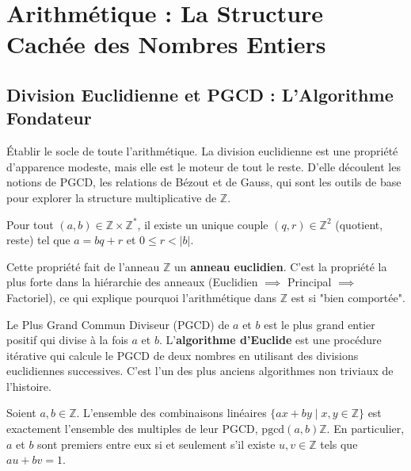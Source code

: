 \chapter{Arithmétique : La Structure Cachée des Nombres Entiers}

\section{Division Euclidienne et PGCD : L'Algorithme Fondateur}

\begin{objectif}
    Établir le socle de toute l'arithmétique. La division euclidienne est une propriété d'apparence modeste, mais elle est le moteur de tout le reste. D'elle découlent les notions de PGCD, les relations de Bézout et de Gauss, qui sont les outils de base pour explorer la structure multiplicative de $\mathbb{Z}$.
\end{objectif}

\begin{theorem}
    Pour tout $(a,b) \in \mathbb{Z} \times \mathbb{Z}^*$, il existe un unique couple $(q,r) \in \mathbb{Z}^2$ (quotient, reste) tel que $a = bq + r$ et $0 \leq r < |b|$.
\end{theorem}

\begin{remark}
    Cette propriété fait de l'anneau $\mathbb{Z}$ un \textbf{anneau euclidien}. C'est la propriété la plus forte dans la hiérarchie des anneaux (Euclidien $\implies$ Principal $\implies$ Factoriel), ce qui explique pourquoi l'arithmétique dans $\mathbb{Z}$ est si "bien comportée".
\end{remark}

\begin{definition}
    Le Plus Grand Commun Diviseur (PGCD) de $a$ et $b$ est le plus grand entier positif qui divise à la fois $a$ et $b$.
    L'\textbf{algorithme d'Euclide} est une procédure itérative qui calcule le PGCD de deux nombres en utilisant des divisions euclidiennes successives. C'est l'un des plus anciens algorithmes non triviaux de l'histoire.
\end{definition}

\begin{theorem}
    Soient $a, b \in \mathbb{Z}$. L'ensemble des combinaisons linéaires $\{ax+by \mid x,y \in \mathbb{Z}\}$ est exactement l'ensemble des multiples de leur PGCD, $\mathrm{pgcd}(a,b)\mathbb{Z}$.
    En particulier, $a$ et $b$ sont premiers entre eux si et seulement s'il existe $u,v \in \mathbb{Z}$ tels que $au+bv=1$.
\end{theorem}

